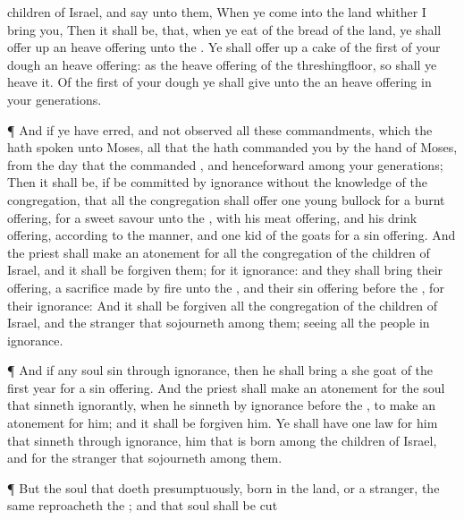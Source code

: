 {children of
Israel, and
say unto them, When ye
come into the
land whither I
bring you,
Then it shall be, that, when ye
eat of the
bread of the
land, ye shall offer
up an heave
offering unto the
{}.
Ye shall offer
up a
cake of the
first of your
dough
{} an heave
offering: as
{} the heave
offering of the
threshingfloor, so shall ye
heave it.
Of the
first of your
dough ye shall
give unto the
{} an heave
offering in your
generations.
\par }{\PP {}¶ And if ye have
erred, and not
observed all these
commandments, which the
{} hath
spoken unto
Moses,
 all that the
{} hath
commanded you by the
hand of
Moses, from the
day that the
{}
commanded
{}, and
henceforward among your
generations;
Then it shall be, if
{} be
committed by
ignorance without the
knowledge of the
congregation, that all the
congregation shall
offer
one
young
bullock for a burnt
offering, for a
sweet
savour unto the
{}, with his meat
offering, and his drink
offering, according to the
manner, and
one
kid of the
goats for a sin
offering.
And the
priest shall make an
atonement for all the
congregation of the
children of
Israel, and it shall be
forgiven them; for it
{}
ignorance: and they shall
bring their
offering, a sacrifice made by
fire unto the
{}, and their sin
offering
before the
{}, for their
ignorance:
And it shall be
forgiven all the
congregation of the
children of
Israel, and the
stranger that
sojourneth
among them; seeing all the
people
{} in
ignorance.
\par }{\PP {}¶ And if
any
soul
sin through
ignorance, then he shall
bring a she
goat of the
first
year for a sin
offering.
And the
priest shall make an
atonement for the
soul that sinneth
ignorantly, when he
sinneth by
ignorance
before the
{}, to make an
atonement for him; and it shall be
forgiven him.
Ye shall have
one
law for him that
sinneth through
ignorance,
{} him that is
born among the
children of
Israel, and for the
stranger that
sojourneth
among them.
\par }{\PP {}¶ But the
soul that
doeth
{}
presumptuously,
{} born in the
land, or a
stranger, the same
reproacheth the
{}; and that
soul shall be cut
}

